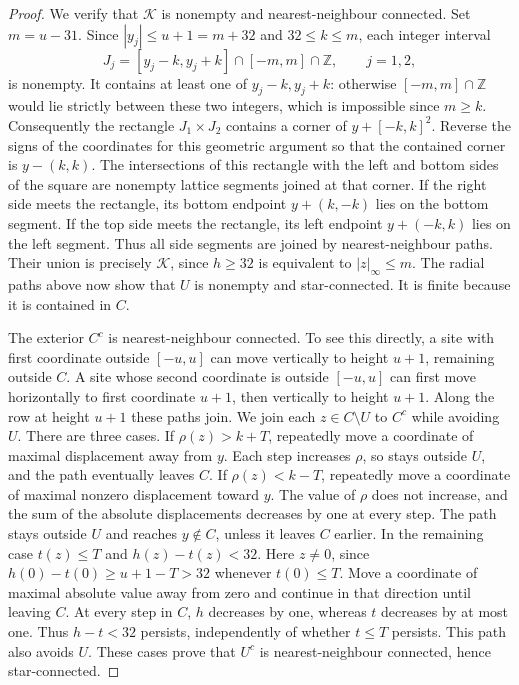 \begin{proof}
We verify that \(\mathcal K\) is nonempty and nearest-neighbour
connected.  Set \(m=u-31\).  Since \(|y_j|\le u+1=m+32\)
and \(32\le k\le m\), each integer interval
\[
 J_j=[y_j-k,y_j+k]\cap[-m,m]\cap\mathbb Z,
       \qquad j=1,2,
\]
is nonempty.  It contains at least one of \(y_j-k,y_j+k\):
otherwise \([-m,m]\cap\mathbb Z\) would lie strictly between
these two integers, which is impossible since \(m\ge k\).
Consequently the rectangle \(J_1\times J_2\) contains a corner
of \(y+[-k,k]^2\).  Reverse the signs of the coordinates for
this geometric argument so that the contained corner is
\(y-(k,k)\).  The intersections of this rectangle with the left
and bottom sides of the square are nonempty lattice segments
joined at that corner.  If the right side meets the rectangle,
its bottom endpoint \(y+(k,-k)\) lies on the bottom segment.
If the top side meets the rectangle, its left endpoint
\(y+(-k,k)\) lies on the left segment.  Thus all side segments
are joined by nearest-neighbour paths.  Their union is precisely
\(\mathcal K\), since \(h\ge32\) is equivalent to
\(|z|_\infty\le m\).  The radial paths above now show that
\(U\) is nonempty and star-connected.  It is finite because
it is contained in \(C\).

The exterior \(C^c\) is nearest-neighbour connected.  To see this
directly, a site with first coordinate outside \([-u,u]\) can
move vertically to height \(u+1\), remaining outside \(C\).
A site whose second coordinate is outside \([-u,u]\) can first
move horizontally to first coordinate \(u+1\), then vertically
to height \(u+1\).  Along the row at height \(u+1\) these paths
join.  We join each \(z\in C\setminus U\) to \(C^c\) while
avoiding \(U\).  There are three cases.
If \(\rho(z)>k+T\), repeatedly move a coordinate of maximal
displacement away from \(y\).  Each step increases \(\rho\),
so stays outside \(U\), and the path eventually leaves \(C\).
If \(\rho(z)<k-T\), repeatedly move a coordinate of maximal
nonzero displacement toward \(y\).  The value of \(\rho\)
does not increase, and the sum of the absolute displacements
decreases by one at every step.  The path stays outside \(U\)
and reaches \(y\notin C\), unless it leaves \(C\) earlier.
In the remaining case \(t(z)\le T\) and \(h(z)-t(z)<32\).
Here \(z\ne0\), since \(h(0)-t(0)\ge u+1-T>32\) whenever
\(t(0)\le T\).  Move a coordinate of maximal absolute value
away from zero and continue in that direction until leaving
\(C\).  At every step in \(C\), \(h\) decreases by one,
whereas \(t\) decreases by at most one.  Thus \(h-t<32\)
persists, independently of whether \(t\le T\) persists.
This path also avoids \(U\).  These cases prove that \(U^c\)
is nearest-neighbour connected, hence star-connected.


\end{proof}
